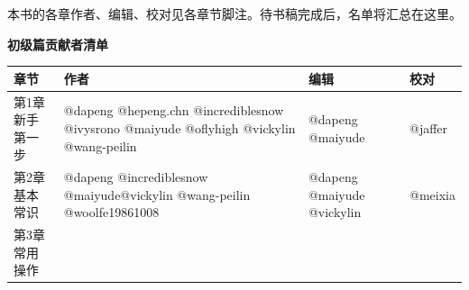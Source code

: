 \documentclass[]{ctexbook}
\begin{document}
本书的各章作者、编辑、校对见各章节脚注。待书稿完成后，名单将汇总在这里。

\textbf{初级篇贡献者清单}

\begin{longtable}[]{@{}llll@{}}
\toprule
\begin{minipage}[b]{0.13\columnwidth}\raggedright
章节\strut
\end{minipage} & \begin{minipage}[b]{0.49\columnwidth}\raggedright
作者\strut
\end{minipage} & \begin{minipage}[b]{0.21\columnwidth}\raggedright
编辑\strut
\end{minipage} & \begin{minipage}[b]{0.06\columnwidth}\raggedright
校对\strut
\end{minipage}\tabularnewline
\midrule
\endhead
\begin{minipage}[t]{0.13\columnwidth}\raggedright
第1章 新手第一步\strut
\end{minipage} & \begin{minipage}[t]{0.49\columnwidth}\raggedright
@dapeng @hepeng.chn @incrediblesnow @ivysrono @maiyude @oflyhigh @vickylin @wang-peilin\strut
\end{minipage} & \begin{minipage}[t]{0.21\columnwidth}\raggedright
@dapeng @maiyude\strut
\end{minipage} & \begin{minipage}[t]{0.06\columnwidth}\raggedright
@jaffer\strut
\end{minipage}\tabularnewline
\begin{minipage}[t]{0.13\columnwidth}\raggedright
第2章 基本常识\strut
\end{minipage} & \begin{minipage}[t]{0.49\columnwidth}\raggedright
@dapeng @incrediblesnow @maiyude@vickylin @wang-peilin @woolfe19861008\strut
\end{minipage} & \begin{minipage}[t]{0.21\columnwidth}\raggedright
@dapeng @maiyude @vickylin\strut
\end{minipage} & \begin{minipage}[t]{0.06\columnwidth}\raggedright
@meixia\strut
\end{minipage}\tabularnewline
\begin{minipage}[t]{0.13\columnwidth}\raggedright
第3章 常用操作\strut
\end{minipage} & \begin{minipage}[t]{0.49\columnwidth}\raggedright

\end{minipage}
\end{longtable}
\end{document}
